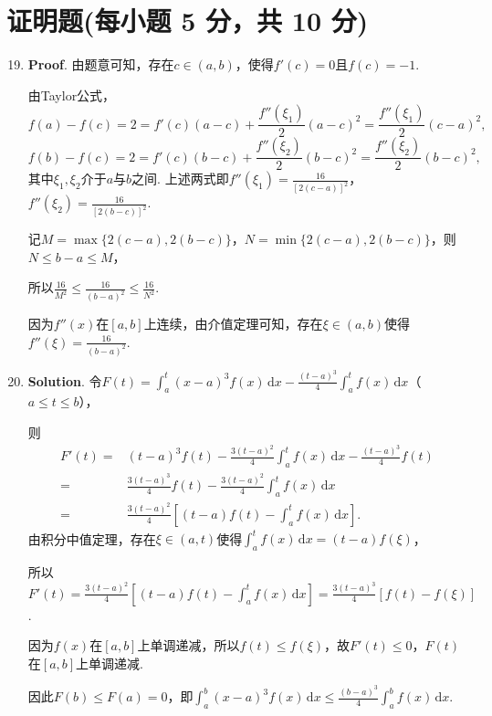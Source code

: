 \documentclass[../main.tex]{subfiles}
\begin{document}
\section{证明题(每小题 5 分，共 10 分)}
\begin{enumerate}
    \setcounter{enumi}{18}
    \item \textbf{Proof}. 由题意可知，存在$c\in(a,b)$，使得$f'(c)=0$且$f(c)=
              -1$.

          由Taylor公式，
          \[
              f(a)-f(c)=2=f'(c)(a-c)+\frac{f''(\xi_{1})}{2}(a-c)^2=\frac{f''(\xi_{1})}{2}(c-a)^2,
          \]
          \[
              f(b)-f(c)=2=f'(c)(b-c)+\frac{f''(\xi_{2})}{2}(b-c)^2=\frac{f''(\xi_{2})}{2}(b-c)^2,
          \]
          其中$\xi_{1},\xi_{2}$介于$a$与$b$之间. 上述两式即$f''(\xi_{1})=\frac{16}{[2(c-a)]^{2}}$，$f
              ''(\xi_{2})=\frac{16}{[2(b-c)]^{2}}$.

          记$M=\max\{2(c-a),2(b-c)\}$，$N=\min\{2(c-a),2(b-c)\}$，则$N\leq b-a \leq M$，

          所以$\frac{16}{M^{2}}\leq\frac{16}{(b-a)^{2}}\leq\frac{16}{N^{2}}$.

          因为$f''(x)$在$[a,b]$上连续，由介值定理可知，存在$\xi\in(a,b)$使得$f''(\xi)
              =\frac{16}{(b-a)^{2}}$.

    \item \textbf{Solution}. 令$F(t)=\int_{a}^{t}(x-a)^{3} f(x)\,\mathrm{d}x-\frac{(t-a)^{3}}{4}
              \int_{a}^{t}f(x)\,\mathrm{d}x$（$a\leq t \leq b$），

          则
          \[
              \begin{aligned}
                  F'(t) = {} & (t-a)^{3} f(t) - \frac{3(t-a)^2}{4}\int_{a}^{t}f(x)\,\mathrm{d}x - \frac{(t-a)^3}{4}f(t) \\
                  = {}       & \frac{3(t-a)^3}{4}f(t) - \frac{3(t-a)^2}{4}\int_{a}^{t}f(x)\,\mathrm{d}x                 \\
                  = {}       & \frac{3(t-a)^2}{4}\left[(t-a)f(t) - \int_{a}^{t}f(x)\,\mathrm{d}x\right].
              \end{aligned}
          \]
          由积分中值定理，存在$\xi\in(a,t)$使得$\int_{a}^{t}f(x)\,\mathrm{d}x = (t-a)f(
              \xi)$，

          所以$F'(t) = \frac{3(t-a)^{2}}{4}\left[(t-a)f(t) - \int_{a}^{t}f(x)\,\mathrm{d}
                  x\right] = \frac{3(t-a)^{3}}{4}[f(t) - f(\xi)]$.

          因为$f(x)$在$[a,b]$上单调递减，所以$f(t)\leq f(\xi)$，故$F'(t)\leq0$，$F(t)$在$[
                  a,b]$上单调递减.

          因此$F(b) \leq F(a) = 0$，即$\int_{a}^{b}(x-a)^{3} f(x)\,\mathrm{d}x \leq \frac{(b-a)^{3}}{4}
              \int_{a}^{b}f(x)\,\mathrm{d}x$.

\end{enumerate}
\end{document}
